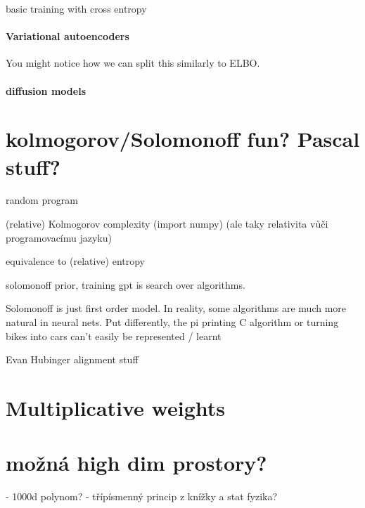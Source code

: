 \documentclass{article}
\begin{document}
basic training with cross entropy

\paragraph{Variational autoencoders}

You might notice how we can split this similarly to ELBO. 

\paragraph{diffusion models}



\section{kolmogorov/Solomonoff fun? Pascal stuff? }

random program

(relative) Kolmogorov complexity (import numpy)
(ale taky relativita vůči programovacímu jazyku)


equivalence to (relative) entropy

solomonoff prior, training gpt is search over algorithms. 

Solomonoff is just first order model. In reality, some algorithms are much more natural in neural nets. Put differently, the pi printing C algorithm or turning bikes into cars can't easily be represented / learnt   

Evan Hubinger alignment stuff

\section{Multiplicative weights}

\section{možná high dim prostory?}

- 1000d polynom?
- třípísmenný princip z knížky a stat fyzika?
\end{document}
